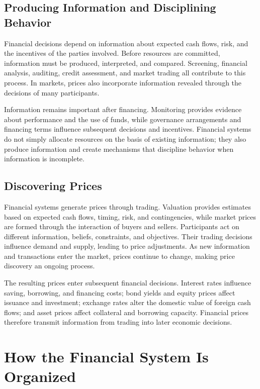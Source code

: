 \subsection{Producing Information and Disciplining Behavior}

Financial decisions depend on information about expected cash flows, risk, and the incentives of the parties involved. Before resources are committed, information must be produced, interpreted, and compared. Screening, financial analysis, auditing, credit assessment, and market trading all contribute to this process. In markets, prices also incorporate information revealed through the decisions of many participants.

Information remains important after financing. Monitoring provides evidence about performance and the use of funds, while governance arrangements and financing terms influence subsequent decisions and incentives. Financial systems do not simply allocate resources on the basis of existing information; they also produce information and create mechanisms that discipline behavior when information is incomplete.

\subsection{Discovering Prices}

Financial systems generate prices through trading. Valuation provides estimates based on expected cash flows, timing, risk, and contingencies, while market prices are formed through the interaction of buyers and sellers. Participants act on different information, beliefs, constraints, and objectives. Their trading decisions influence demand and supply, leading to price adjustments. As new information and transactions enter the market, prices continue to change, making price discovery an ongoing process.

The resulting prices enter subsequent financial decisions. Interest rates influence saving, borrowing, and financing costs; bond yields and equity prices affect issuance and investment; exchange rates alter the domestic value of foreign cash flows; and asset prices affect collateral and borrowing capacity. Financial prices therefore transmit information from trading into later economic decisions.

\section{How the Financial System Is Organized}

